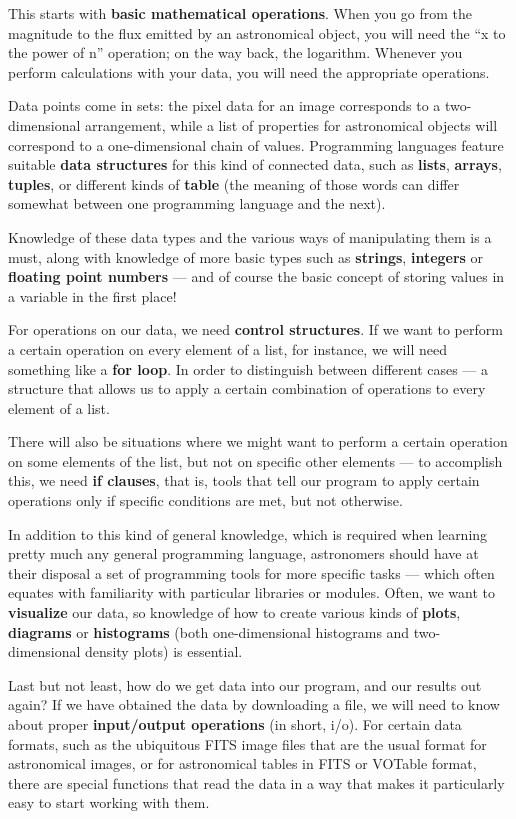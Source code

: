 \documentclass[twocolumn,apj]{openjournal}
\begin{document}
This starts with {\bf basic mathematical operations}. When you go from the magnitude to the flux emitted by an astronomical object, you will need the ``x to the power of n'' operation; on the way back, the logarithm. Whenever you perform calculations with your data, you will need the appropriate operations.

Data points come in sets: the pixel data for an image corresponds to a two-dimensional arrangement, while a list of properties for astronomical objects will correspond to a one-dimensional chain of values. Programming languages feature suitable {\bf data structures} for this kind of connected data, such as {\bf lists}, {\bf arrays}, {\bf tuples}, or different kinds of {\bf table} (the meaning of those words can differ somewhat between one programming language and the next). 

Knowledge of these data types and the various ways of manipulating them is a must, along with knowledge of more basic types such as {\bf strings}, {\bf integers} or {\bf floating point numbers} --- and of course the basic concept of storing values in a variable in the first place!

For operations on our data, we need {\bf control structures}. If we want to perform a certain operation on every element of a list, for instance, we will need something like a {\bf for loop}. In order to distinguish between different cases --- a structure that allows us to apply a certain combination of operations to every element of a list. 

There will also be situations where we might want to perform a certain operation on some elements of the list, but not on specific other elements --- to accomplish this, we need {\bf if clauses}, that is, tools that tell our program to apply certain operations only if specific conditions are met, but not otherwise. 

In addition to this kind of general knowledge, which is required when learning pretty much any general programming language, astronomers should have at their disposal a set of programming tools for more specific tasks --- which often equates with familiarity with particular libraries or modules. Often, we want to {\bf visualize} our data, so knowledge of how to create various kinds of {\bf plots}, {\bf diagrams} or {\bf histograms} (both one-dimensional histograms and two-dimensional density plots) is essential.

Last but not least, how do we get data into our program, and our results out again? If we have obtained the data by downloading a file, we will need to know about proper {\bf input/output operations} (in short, i/o). For certain data formats, such as the ubiquitous FITS image files that are the usual format for astronomical images, or for astronomical tables in FITS or VOTable format, there are special functions that read the data in a way that makes it particularly easy to start working with them. 
\end{document}
